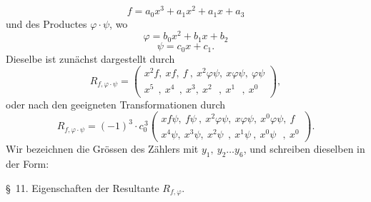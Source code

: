 \[
f = a_0x^3 + a_1x^2 + a_1x + a_3 %
\]
und des Productes $\varphi\cdot\psi$, wo
\[
\varphi = b_0x^2+b_1x+b_2
\]
\[
\psi = c_0x+c_1.
\]
Dieselbe ist zun\"achst dargestellt durch
\[
R_{f,\varphi\cdot\psi} =
\begin{pmatrix}
x^2f,\ xf,\ f\ ,\ x^2\varphi\psi,\ x\varphi\psi,\ \varphi\psi\\
x^5\ \ ,\ x^4\ \ ,\ x^3,\ x^2\ \ \ ,\ x^1\ \ \ ,\ x^0
\end{pmatrix},
\]
oder nach den geeigneten Transformationen durch
\[
R_{f,\varphi\cdot\psi} = (-1)^3\cdot c_0^{\,3}
\begin{pmatrix}
xf\psi,\ f\psi\ ,\ x^2\varphi\psi,\ x\varphi\psi,\ x^0\varphi\psi,\ f\\
x^4\psi,\ x^3\psi,\ x^2\psi\ \ ,\ x^1\psi\ ,\ x^0\psi\ \ \ ,\ x^0
\end{pmatrix}.
\]
Wir bezeichnen die Gr\"ossen des Z\"ahlers mit $y_1,\ y_2\ldots y_6$, und schreiben dieselben in der Form:


\S\ 11. Eigenschaften der Resultante $R_{f,\varphi}$.

